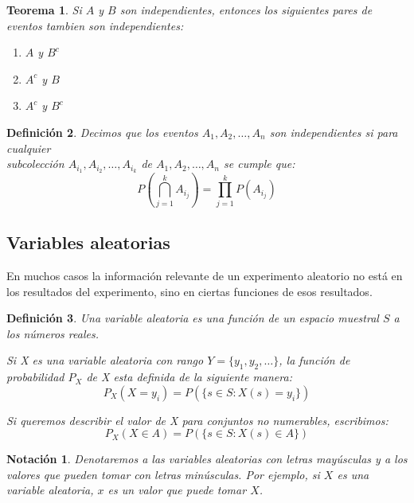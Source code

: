 \documentclass[14pt]{extarticle}
\newtheorem{theorem}{Teorema}[section]
\newtheorem{definition}[theorem]{Definición}
\newtheorem{note}{Notación}[section]
\begin{document}
\begin{theorem}
    Si $A$ y $B$ son independientes, entonces los siguientes pares de eventos tambien son independientes:
    \begin{enumerate}
        \item $A$ y $B^c$
        \item $A^c$ y $B$
        \item $A^c$ y $B^c$
    \end{enumerate}
\end{theorem}

\begin{definition}
    Decimos que los eventos $A_1, A_2, \ldots, A_n$ son independientes si para cualquier \\ 
    subcolección $A_{i_1}, A_{i_2}, \ldots, A_{i_k}$ de $A_1, A_2, \ldots, A_n$ se cumple que:
    \[
        P(\bigcap_{j=1}^k A_{i_j}) = \prod_{j=1}^k P(A_{i_j})
    \]
\end{definition}



\subsection{Variables aleatorias}



En muchos casos la información relevante de un experimento aleatorio no está en los resultados del experimento, sino en ciertas funciones de esos resultados.

\begin{definition}
    Una variable aleatoria es una función de un espacio muestral $S$ a los números reales.

Si X es una variable aleatoria con rango $Y = \{y_1, y_2, \ldots\}$, la función de probabilidad $P_{X}$ de X esta definida de la
siguiente manera: 
\[ P_X(X=y_i) = P(\{s \in S : X(s) = y_i\}) \]

Si queremos describir el valor de X para conjuntos no numerables, escribimos:
\[ P_X(X \in A) = P(\{s \in S : X(s) \in A\}) \]
\end{definition}

\begin{note}
    Denotaremos a las variables aleatorias con letras mayúsculas y a los valores que pueden tomar con letras minúsculas.
    Por ejemplo, si $X$ es una variable aleatoria, $x$ es un valor que puede tomar $X$.
\end{note}
\end{document}
